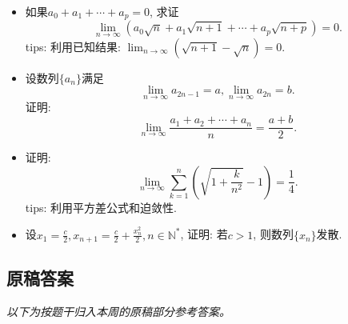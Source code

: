 \documentclass[UTF8,11pt, a4paper, oneside, fontset=none]{ctexbook}
\begin{document}
\begin{itemize}
\item[4.]
如果$a_0 + a_1 + \cdots + a_p =0$, 求证
\[
\lim_{n \to \infty} (a_0 \sqrt n + a_1 \sqrt{n+1} + \cdots + a_p \sqrt{n+p})=0.
\]
tips: 利用已知结果: $\lim_{n \to \infty} (\sqrt{n+1} - \sqrt n) =0$.

\item[5.]
设数列$\{a_n\}$满足
\[
\lim_{n \to \infty} a_{2n-1} =a, \lim_{n \to \infty} a_{2n} =b.
\]
证明:
\[
\lim_{n \to \infty} \frac{a_1 + a_2 + \cdots + a_n}{n} = \frac{a+b}{2}.
\]

\item[6.]
证明:
\[
\lim_{n \to \infty} \sum_{k=1}^n \left( \sqrt{1 + \frac{k}{n^2} } -1\right) = \frac{1}{4}.
\]
tips: 利用平方差公式和迫敛性. 

\item[7.] 设$x_1 = \frac{c}{2}, x_{n+1} = \frac{c}{2} + \frac{x_n^2}{2}, n \in \mathbb N^*$, 证明: 若$c>1$, 则数列$\{x_n \}$发散.

\end{itemize}

\clearpage

\subsection*{原稿答案}

\noindent\emph{以下为按题干归入本周的原稿部分参考答案。}
\end{document}

